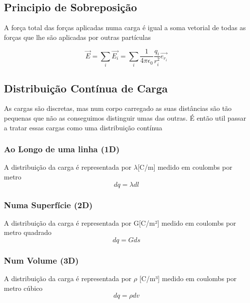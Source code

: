 \documentclass[a4paper]{article}
\begin{document}
\subsection{Principio de Sobreposição}
A força total das forças aplicadas numa carga é igual a soma vetorial 
de todas as forças que lhe são aplicadas por outras partículas
\begin{center}
\end{center}
\[ \vec{E} = \sum_{i}^{}\vec{E_i} 
= \sum_{i}^{} \frac{1}{4\pi\epsilon_0} \frac{q_i}{r_i^2} \vec{e_{r_i}} \]

\subsection{Distribuição Contínua de Carga}
As cargas são discretas, mas num corpo carregado as suas distâncias são tão pequenas que não as conseguimos distinguir umas das outras.
É então util passar a tratar essas cargas como uma distribuição contínua

\subsubsection{Ao Longo de uma linha (1D)}
A distribuição da carga é representada por $\lambda$[C/m] medido em coulombs por metro
\[dq = \lambda dl\]

\subsubsection{Numa Superfície (2D)}
A distribuição da carga é representada por G[C/m²] medido em coulombs por metro quadrado
\[dq = Gds\]

\subsubsection{Num Volume (3D)}
A distribuição da carga é representada por $\rho$ [C/m³] medido em coulombs por metro cúbico
\[dq = \rho dv\]
\end{document}
